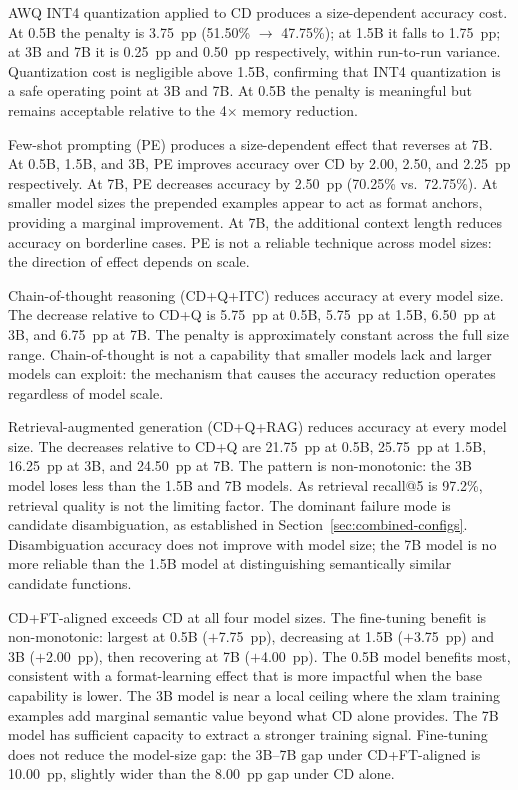 AWQ INT4 quantization applied to CD produces a size-dependent accuracy cost.
At 0.5B the penalty is 3.75~pp (51.50\% $\to$ 47.75\%); at 1.5B it falls to
1.75~pp; at 3B and 7B it is 0.25~pp and 0.50~pp respectively, within
run-to-run variance. Quantization cost is negligible above 1.5B, confirming
that INT4 quantization is a safe operating point at 3B and 7B. At 0.5B the
penalty is meaningful but remains acceptable relative to the 4$\times$ memory
reduction.

Few-shot prompting (PE) produces a size-dependent effect that reverses at 7B.
At 0.5B, 1.5B, and 3B, PE improves accuracy over CD by 2.00, 2.50, and
2.25~pp respectively. At 7B, PE decreases accuracy by 2.50~pp (70.25\%
vs.\ 72.75\%). At smaller model sizes the prepended examples appear to act as
format anchors, providing a marginal improvement. At 7B, the additional context
length reduces accuracy on borderline cases. PE is not a reliable technique
across model sizes: the direction of effect depends on scale.

Chain-of-thought reasoning (CD+Q+ITC) reduces accuracy at every model size.
The decrease relative to CD+Q is 5.75~pp at 0.5B, 5.75~pp at 1.5B, 6.50~pp
at 3B, and 6.75~pp at 7B. The penalty is approximately constant across the
full size range. Chain-of-thought is not a capability that smaller models lack
and larger models can exploit: the mechanism that causes the accuracy reduction
operates regardless of model scale.

Retrieval-augmented generation (CD+Q+RAG) reduces accuracy at every model
size. The decreases relative to CD+Q are 21.75~pp at 0.5B, 25.75~pp at 1.5B,
16.25~pp at 3B, and 24.50~pp at 7B. The pattern is non-monotonic: the 3B
model loses less than the 1.5B and 7B models. As retrieval recall@5 is 97.2\%,
retrieval quality is not the limiting factor. The dominant failure mode is
candidate disambiguation, as established in
Section~\ref{sec:combined-configs}. Disambiguation accuracy does not improve
with model size; the 7B model is no more reliable than the 1.5B model at
distinguishing semantically similar candidate functions.

CD+FT-aligned exceeds CD at all four model sizes. The fine-tuning benefit is
non-monotonic: largest at 0.5B ($+$7.75~pp), decreasing at 1.5B ($+$3.75~pp)
and 3B ($+$2.00~pp), then recovering at 7B ($+$4.00~pp). The 0.5B model
benefits most, consistent with a format-learning effect that is more impactful
when the base capability is lower. The 3B model is near a local ceiling where
the xlam training examples add marginal semantic value beyond what CD alone
provides. The 7B model has sufficient capacity to extract a stronger training
signal. Fine-tuning does not reduce the model-size gap: the 3B--7B gap under
CD+FT-aligned is 10.00~pp, slightly wider than the 8.00~pp gap under CD alone.

